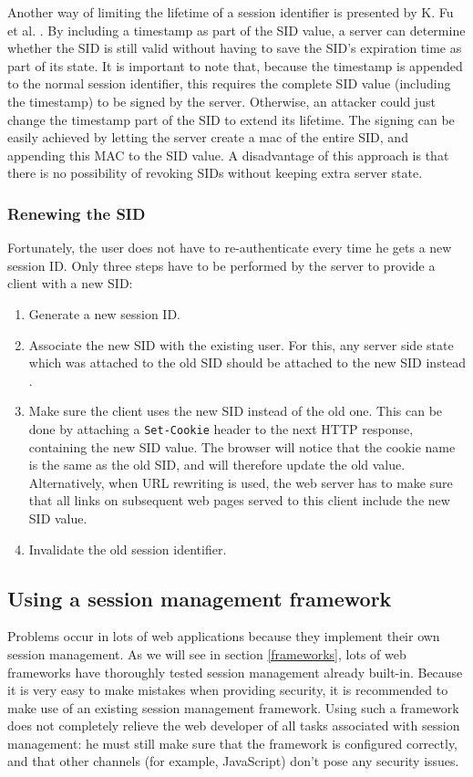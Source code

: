 Another way of limiting the lifetime of a session identifier is presented by K. Fu et al. \cite{Fu2001}. By including a timestamp as part of the SID value, a server can determine whether the SID is still valid without having to save the SID's expiration time as part of its state. It is important to note that, because the timestamp is appended to the normal session identifier, this requires the complete SID value (including the timestamp) to be signed by the server. Otherwise, an attacker could just change the timestamp part of the SID to extend its lifetime. The signing can be easily achieved by letting the server create a \gls{mac} of the entire SID, and appending this MAC to the SID value. A disadvantage of this approach is that there is no possibility of revoking SIDs without keeping extra server state.

\subsubsection{Renewing the SID}\label{renewing-sid}
Fortunately, the user does not have to re-authenticate every time he gets a new session ID. Only three steps have to be performed by the server to provide a client with a new SID:
\begin{enumerate}
	\item Generate a new session ID.
	\item Associate the new SID with the existing user. For this, any server side state which was attached to the old SID should be attached to the new SID instead \cite{Wasser2007}.
	\item Make sure the client uses the new SID instead of the old one. This can be done by attaching a \texttt{Set-Cookie} header to the next HTTP response, containing the new SID value. The browser will notice that the cookie name is the same as the old SID, and will therefore update the old value. Alternatively, when URL rewriting is used, the web server has to make sure that all links on subsequent web pages served to this client include the new SID value.
	\item Invalidate the old session identifier.
\end{enumerate}

\subsection{Using a session management framework}

Problems occur in lots of web applications because they implement their own session management. As we will see in section \ref{frameworks}, lots of web frameworks have thoroughly tested session management already built-in. Because it is very easy to make mistakes when providing security, it is recommended to make use of an existing session management framework. Using such a framework does not completely relieve the web developer of all tasks associated with session management: he must still make sure that the framework is configured correctly, and that other channels (for example, JavaScript) don't pose any security issues.
